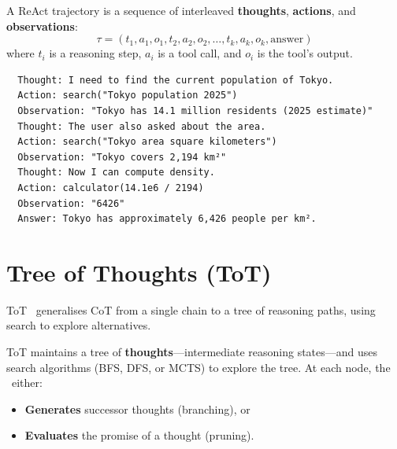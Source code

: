 \begin{definition}
	A ReAct trajectory is a sequence of interleaved \textbf{thoughts}, \textbf{actions}, and \textbf{observations}:
	\begin{equation}
		\tau = (t_1, a_1, o_1, t_2, a_2, o_2, \dots, t_k, a_k, o_k, \text{answer})
	\end{equation}
	where $t_i$ is a reasoning step, $a_i$ is a tool call, and $o_i$ is the tool's output.
\end{definition}

\begin{example}
	\begin{lstlisting}
  Thought: I need to find the current population of Tokyo.
  Action: search("Tokyo population 2025")
  Observation: "Tokyo has 14.1 million residents (2025 estimate)"
  Thought: The user also asked about the area.
  Action: search("Tokyo area square kilometers")
  Observation: "Tokyo covers 2,194 km²"
  Thought: Now I can compute density.
  Action: calculator(14.1e6 / 2194)
  Observation: "6426"
  Answer: Tokyo has approximately 6,426 people per km².
  \end{lstlisting}
\end{example}

\section{Tree of Thoughts (ToT)}

ToT~\cite{yao2023tree} generalises CoT from a single chain to a tree of reasoning paths, using search to explore alternatives.

\begin{definition}
	ToT maintains a tree of \textbf{thoughts}---intermediate reasoning states---and uses search algorithms (BFS, DFS, or MCTS) to explore the tree. At each node, the \llm\ either:
	\begin{itemize}
		\item \textbf{Generates} successor thoughts (branching), or
		\item \textbf{Evaluates} the promise of a thought (pruning).
	\end{itemize}
\end{definition}

